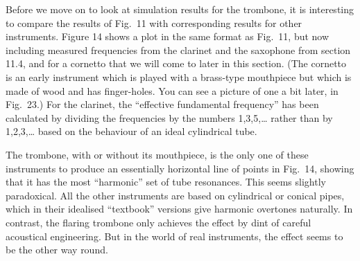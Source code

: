 
  Before we move on to look at simulation results for the trombone, it is 
  interesting to compare the results of Fig.\ 11 with corresponding results for 
  other instruments. Figure 14 shows a plot in the same format as Fig.\ 11, but 
  now including measured frequencies from the clarinet and the saxophone from 
  section 11.4, and for a cornetto that we will come to later in this section. 
  (The cornetto is an early instrument which is played with a brass-type 
  mouthpiece but which is made of wood and has finger-holes. You can see a 
  picture of one a bit later, in Fig.\ 23.) For the clarinet, the “effective 
  fundamental frequency” has been calculated by dividing the frequencies by the 
  numbers 1,3,5,… rather than by 1,2,3,… based on the behaviour of an ideal 
  cylindrical tube. 


  The trombone, with or without its mouthpiece, is the only one of these 
  instruments to produce an essentially horizontal line of points in Fig.\ 14, 
  showing that it has the most “harmonic” set of tube resonances. This seems 
  slightly paradoxical. All the other instruments are based on cylindrical or 
  conical pipes, which in their idealised “textbook” versions give harmonic 
  overtones naturally. In contrast, the flaring trombone only achieves the 
  effect by dint of careful acoustical engineering. But in the world of real 
  instruments, the effect seems to be the other way round. 

